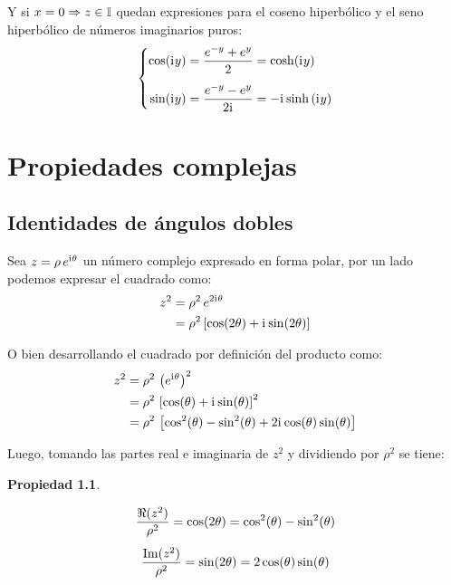 \documentclass[a5paper,12pt,twoside]{book}
\newtheorem{prop}{{Propiedad}}[chapter]
\begin{document}
Y si $x=0 \Rightarrow z \in \mathbb{I}$ quedan expresiones para el coseno hiperbólico y el seno hiperbólico de números imaginarios puros:
\begin{equation*}
    \left\{
    \begin{aligned}
        \cos(\mathrm{i}\mkern1mu y) &= \frac{e^{-y} + e^y}{2} = \cosh(\mathrm{i}\mkern1mu y)
        \\[1ex]
        \sin(\mathrm{i}\mkern1mu y) &= \frac{e^{-y} - e^y}{2\mathrm{i}\mkern1mu} = -\mathrm{i}\mkern1mu \sinh{(\mathrm{i}\mkern1muy)}
    \end{aligned}
    \right.
\end{equation*}


\chapter{Propiedades complejas}


\section{Identidades de ángulos dobles}

Sea $z=\rho \, e^{\mathrm{i}\mkern1mu \theta}$ un número complejo expresado en forma polar, por un lado podemos expresar el cuadrado como:
\begin{align*}
    z^2 &= \rho^2 \, e^{2 \mathrm{i}\mkern1mu \theta}
    \\
    &= \rho^2 \left[ \cos(2 \theta) + \mathrm{i}\mkern1mu \sin(2 \theta) \right]
\end{align*}

O bien desarrollando el cuadrado por definición del producto como:
\begin{align*}
    z^2 &= \rho^2 \, \left(e^{\mathrm{i}\mkern1mu \theta}\right)^2
    \\
    &= \rho^2 \, \left[ \cos(\theta) + \mathrm{i}\mkern1mu \sin(\theta) \right]^2
    \\
    &= \rho^2 \, \left[ \cos^2(\theta) - \sin^2(\theta) + 2\mathrm{i}\mkern1mu \cos(\theta) \sin(\theta) \right]
\end{align*}

Luego, tomando las partes real e imaginaria de $z^2$ y dividiendo por $\rho^2$ se tiene:

\begin{mdframed}[style=MyFrame1]
    \begin{prop}
    \end{prop}
    \begin{gather*}
        \frac{\Re (z^2)}{\rho^2} = \cos(2 \theta) = \cos^2(\theta) - \sin^2(\theta)
        \\[1ex]
        \frac{\operatorname{Im} (z^2)}{\rho^2} = \sin(2 \theta) = 2\cos(\theta) \sin(\theta)
    \end{gather*}
\end{mdframed}
\end{document}
